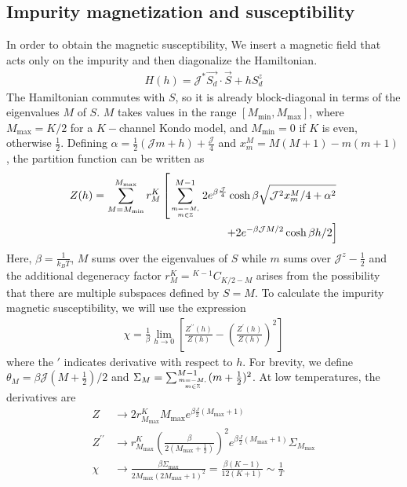 \documentclass[reprint,prb,superscriptaddress]{revtex4-2}
\begin{document}
\subsection{Impurity magnetization and susceptibility}
In order to obtain the magnetic susceptibility, We insert a magnetic field that acts only on the impurity and then diagonalize the Hamiltonian.
\begin{align}
	\label{stargraph_field_hamiltonian}
	H(h) = {\mathcal{J}^*} \vec{S_d}\cdot\vec{S} + h S_d^z
\end{align}
The Hamiltonian commutes with \(S\), so it is already block-diagonal in terms of the eigenvalues \(M\) of \(S\). \(M\) takes values in the range \(\left[M_\text{min}, M_\text{max}\right]\), where \(M_\text{max} = K/2\) for a \(K-\)channel Kondo model, and \(M_\text{min} = 0\)  if \(K\) is even, otherwise \(\frac{1}{2}\). Defining \(\alpha = \frac{1}{2}\left({\mathcal{J}}m + h\right) + \frac{{\mathcal{J}}}{4}\) and \(x^M_m = M(M+1) - m(m+1)\), the partition function can be written as
\begin{align}
	Z(h) =\sum_{M=M_\text{min}}^{M_\text{max}}r^K_M\left[\sum_{m=-M, \atop{m\in \mathbb{Z}}}^{M-1}2e^{\beta \frac{{\mathcal{J}}}{4}}\cosh \beta\sqrt{{\mathcal{J}}^2x^M_m/4 + \alpha^2} \right.\nonumber\\
\left.+ 2e^{-\beta {\mathcal{J}}M/2}\cosh \beta h/2\right]
\end{align}
Here, \(\beta = \frac{1}{k_B T}\), \(M\) sums over the eigenvalues of \(S\) while \(m\) sums over \({\mathcal{J}}^z - \frac{1}{2}\) and the additional degeneracy factor \(r^K_M= {}^{K-1}C_{K/2 - M}\) arises from the possibility that there are multiple subspaces defined by \(S=M\). 
To calculate the impurity magnetic susceptibility, we will use the expression
\begin{align}
	\chi = \frac{1}{\beta}\lim_{h \to 0}\left[\frac{Z^{\prime\prime}(h)}{Z(h)} - \left(\frac{Z^{\prime}(h)}{Z(h)}\right)^2 \right] 
\end{align}
where the \(\prime\) indicates derivative with respect to \(h\). For brevity, we define \(\theta_M = \beta {\mathcal{J}} (M+\frac{1}{2})/2\) and \(\Sigma_M = \sum_{m=-M, \atop{m\in \mathbb{Z}}}^{M-1}(m+\frac{1}{2})^2\). At low temperatures, the derivatives are 
\begin{align}
	Z &\to 2 r^K_{M_\text{max}} M_\text{max} e^{\beta \frac{J}{2}(M_\text{max} + 1)}\\
	Z^{\prime \prime} &\to r^K_{M_\text{max}}\left(\frac{\beta }{2(M_\text{max} + \frac{1}{2})}\right)^2 e^{\beta \frac{J}{2}(M_\text{max} + 1)}\Sigma_{M_\text{max}}\\
	\chi &\to \frac{\beta\Sigma_\text{max}}{2M_\text{max}\left(2M_\text{max}+1\right)^2} = \frac{\beta(K-1)}{12(K+1)} \sim \frac{1}{T}
\end{align}
\end{document}
